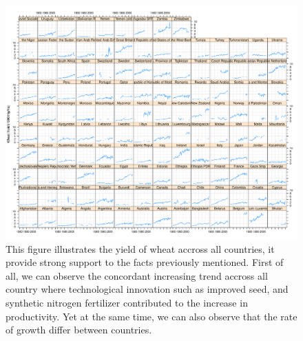 \documentclass[nojss]{jss}\usepackage[]{graphicx}\usepackage[]{color}
\makeatletter
\def\maxwidth{ %
  \ifdim\Gin@nat@width>\linewidth
    \linewidth
  \else
    \Gin@nat@width
  \fi
}
\newenvironment{knitrout}{}{} %
\makeatother
\begin{document}
\begin{knitrout}
\color{fgcolor}\begin{figure}[!ht]


{\centering \includegraphics[width=\maxwidth]{figure/wheat-yield-explore} 

}

\caption[This figure illustrates the yield of wheat accross all countries, it provide strong support to the facts previously mentioned]{This figure illustrates the yield of wheat accross all countries, it provide strong support to the facts previously mentioned. First of all, we can observe the concordant increasing trend accross all country where technological innovation such as improved seed, and synthetic nitrogen fertilizer contributed to the increase in productivity. Yet at the same time, we can also observe that the rate of growth differ between countries.\label{fig:wheat-yield-explore}}
\end{figure}


\end{knitrout}
\end{document}
